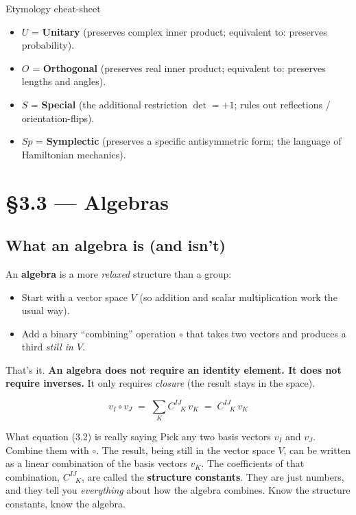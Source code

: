 \documentclass[11pt]{article}
\begin{document}
\begin{intuitionbox}{Etymology cheat-sheet}
\begin{itemize}[leftmargin=1.5em, itemsep=2pt]
  \item $U$ = \textbf{Unitary} (preserves complex inner product;
    equivalent to: preserves probability).
  \item $O$ = \textbf{Orthogonal} (preserves real inner product;
    equivalent to: preserves lengths and angles).
  \item $S$ = \textbf{Special} (the additional restriction
    $\det = +1$; rules out reflections / orientation-flips).
  \item $Sp$ = \textbf{Symplectic} (preserves a specific antisymmetric
    form; the language of Hamiltonian mechanics).
\end{itemize}
\end{intuitionbox}

\section{\S3.3 --- Algebras}

\subsection*{What an algebra is (and isn't)}

An \textbf{algebra} is a more \emph{relaxed} structure than a group:
\begin{itemize}[leftmargin=1.5em, itemsep=2pt]
  \item Start with a vector space $V$ (so addition and scalar
    multiplication work the usual way).
  \item Add a binary ``combining'' operation $\circ$ that takes two
    vectors and produces a third \emph{still in $V$}.
\end{itemize}
That's it. \textbf{An algebra does not require an identity element. It
does not require inverses.} It only requires \emph{closure} (the result
stays in the space).

\begin{equation}
  v_I \circ v_J \;=\; \sum_K C^{IJ}_{\;\;\;K}\, v_K \;=\; C^{IJ}_{\;\;\;K}\, v_K
  \tag{3.2}
\end{equation}

\begin{keybox}{What equation (3.2) is really saying}
Pick any two basis vectors $v_I$ and $v_J$. Combine them with $\circ$.
The result, being still in the vector space $V$, can be written as a
linear combination of the basis vectors $v_K$. The coefficients of that
combination, $C^{IJ}_{\;\;\;K}$, are called the \textbf{structure
constants}. They are just numbers, and they tell you \emph{everything}
about how the algebra combines. Know the structure constants, know the
algebra.
\end{keybox}
\end{document}

